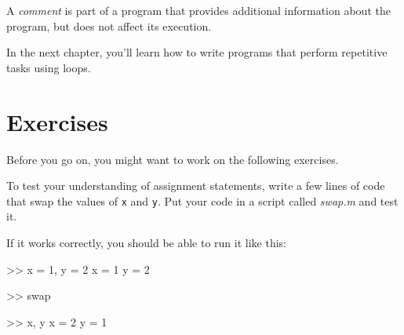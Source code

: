 A \emph{comment} is part of a program that provides additional information
about the program, but does not affect its execution.

In the next chapter, you'll learn how to write programs that perform repetitive tasks using loops.


\section{Exercises}

Before you go on, you might want to work on the following exercises.

\begin{ex}
To test your understanding of assignment statements, write a few lines of code that swap the values of \lstinline{x} and \lstinline{y}.
Put your code in a script called \emph{swap.m} and test it.

If it works correctly, you should be able to run it like this:

\begin{code}
>> x = 1, y = 2
x = 1
y = 2

>> swap

>> x, y
x = 2
y = 1
\end{code}
\end{ex}





